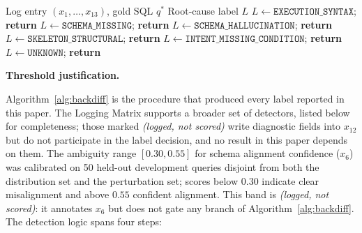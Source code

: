 \documentclass[conference]{IEEEtran}
\begin{document}
\begin{algorithm}
\caption{Backward Diffing for Root-Cause Attribution}
\label{alg:backdiff}
\begin{algorithmic}[1]
\REQUIRE Log entry $(x_1, \ldots, x_{13})$, gold SQL $q^*$
\ENSURE Root-cause label $L$
    \STATE $L \leftarrow \texttt{EXECUTION\_SYNTAX}$; \textbf{return}
\ENDIF
{}
        \STATE $L \leftarrow \texttt{SCHEMA\_MISSING}$; \textbf{return}
    \ENDIF
        \STATE $L \leftarrow \texttt{SCHEMA\_HALLUCINATION}$; \textbf{return}
    \ENDIF
        \STATE $L \leftarrow \texttt{SKELETON\_STRUCTURAL}$; \textbf{return}
    \ENDIF
        \STATE $L \leftarrow \texttt{INTENT\_MISSING\_CONDITION}$; \textbf{return}
    \ENDIF
\ENDIF
\STATE $L \leftarrow \texttt{UNKNOWN}$; \textbf{return}
\end{algorithmic}
\end{algorithm}

\noindent\textbf{Threshold justification.}

Algorithm~\ref{alg:backdiff} is the procedure that produced every label
reported in this paper. The Logging Matrix supports a broader set of detectors,
listed below for completeness; those marked \emph{(logged, not scored)} write
diagnostic fields into $x_{12}$ but do not participate in the label decision,
and no result in this paper depends on them. The ambiguity range $[0.30, 0.55]$
for schema alignment confidence ($x_6$) was calibrated on 50 held-out
development queries disjoint from both the distribution set and the
perturbation set; scores below $0.30$ indicate clear misalignment and above
$0.55$ confident alignment. This band is \emph{(logged, not scored)}: it
annotates $x_6$ but does not gate any branch of
Algorithm~\ref{alg:backdiff}. The detection logic spans four steps:
\end{document}
